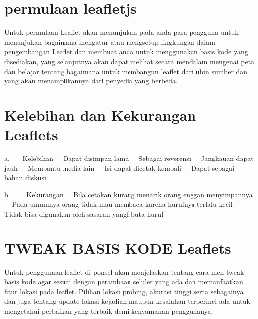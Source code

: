 \section{permulaan leafletjs}
Untuk permulaan Leaflet akan menunjukan pada anda para pengguna untuk menunjukan bagaimana mengatur atau mengsetup lingkungan dalam pengembangan Leaflet dan membuat anda untuk menggunakan basis kode yang disediakan, yang selanjutnya akan dapat melihat secara mendalam mengenai peta dan belajar tentang bagaimana untuk membangun leaflet dari ubin sumber dan yang akan menampilkannya dari penyedia yang berbeda.


\section{Kelebihan dan Kekurangan Leaflets}
a.    Kelebihan
  Dapat disimpan lama
  Sebagai reverensi
  Jangkauan dapat jauh
  Membantu media lain
  Isi dapat dicetak kembali
  Dapat sebagai bahan diskusi

b.     Kekurangan
  Bila cetakan kurang menarik orang enggan menyimpannya
  Pada umumnya orang tidak mau membaca karena hurufnya terlalu kecil
  Tidak bisa digunakan oleh sasaran yangf buta huruf

\section{TWEAK BASIS KODE Leaflets}
Untuk penggunaan leaflet di ponsel akan menjelaskan tentang cara men tweak basis kode agar sesuai dengan perambaan seluler yang ada  dan memanfaatkan fitur lokasi pada leaflet. Pilihan lokasi probing, akurasi tinggi serta sebagainya dan juga tentang update lokasi kejadian maupun kesalahan terperinci ada untuk mengetahui perbaikan yang terbaik demi kenyamanan penggunanya.
